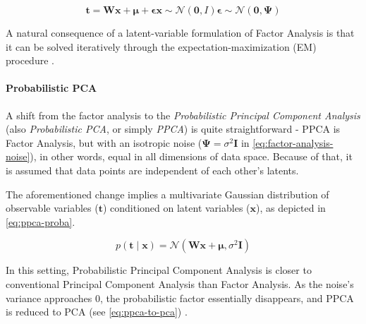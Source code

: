 \begin{subequations}
    \begin{equation}\label{eq:factor-analysis-main}
        \mathbf{t} = \mathbf{Wx} + \boldsymbol{\mu} + \boldsymbol{\epsilon}
    \end{equation}
    \begin{equation}\label{eq:factor-analysis-latent}
        \mathbf{x} \sim \mathcal{N}(\mathbf{0}, \boldsymbol{\mathit{I}})
    \end{equation}
    \begin{equation}\label{eq:factor-analysis-noise}
        \boldsymbol{\epsilon} \sim \mathcal{N}(\mathbf{0}, \boldsymbol{\Psi})
    \end{equation}
\end{subequations}

A natural consequence of a latent-variable formulation of Factor Analysis is that it can be solved iteratively through the expectation-maximization (EM) procedure \cite{Dempster1977}.

  
 
\paragraph{Probabilistic PCA}\label{par:ppca}
A shift from the factor analysis to the \textit{Probabilistic Principal Component Analysis} (also \textit{Probabilistic PCA}, or simply \textit{PPCA}) is quite straightforward - PPCA is Factor Analysis, but with an isotropic noise ($\boldsymbol{\Psi} = \sigma^2\mathbf{I}$ in \autoref{eq:factor-analysis-noise}), in other words, equal in all dimensions of data space. Because of that, it is assumed that data points are independent of each other's latents.

\vspace{\baselineskip}
The aforementioned change implies a multivariate Gaussian distribution of observable variables ($\mathbf{t}$) conditioned on latent variables ($\mathbf{x}$), as depicted in \autoref{eq:ppca-proba}.

\begin{equation}\label{eq:ppca-proba}
p(\mathbf{t} \mid \mathbf{x}) = \mathcal{N}(\mathbf{Wx} + \boldsymbol{\mu}, \sigma^2\mathbf{I})
\end{equation}

\vspace{\baselineskip}
In this setting, Probabilistic Principal Component Analysis is closer to conventional Principal Component Analysis than Factor Analysis. As the noise's variance approaches $0$, the probabilistic factor essentially disappears, and PPCA is reduced to PCA (see \autoref{eq:ppca-to-pca}) \cite{Ghojogh2021}.

